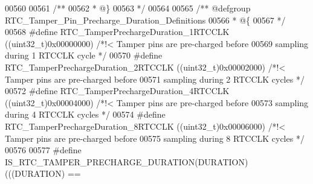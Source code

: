 \begin{DoxyCode}
00560 
00561 \textcolor{comment}{/**}
00562 \textcolor{comment}{  * @\}}
00563 \textcolor{comment}{  */}
00564 
00565   \textcolor{comment}{/** @defgroup RTC\_Tamper\_Pin\_Precharge\_Duration\_Definitions }
00566 \textcolor{comment}{  * @\{}
00567 \textcolor{comment}{  */}
00568 \textcolor{preprocessor}{#}\textcolor{preprocessor}{define} \textcolor{preprocessor}{RTC\_TamperPrechargeDuration\_1RTCCLK} \textcolor{preprocessor}{(}\textcolor{preprocessor}{(}\textcolor{preprocessor}{uint32\_t}\textcolor{preprocessor}{)}0x00000000\textcolor{preprocessor}{)}  \textcolor{comment}{/*!< Tamper pins are pre-charged
       before }
00569 \textcolor{comment}{                                                                         sampling during 1 RTCCLK
       cycle */}
00570 \textcolor{preprocessor}{#}\textcolor{preprocessor}{define} \textcolor{preprocessor}{RTC\_TamperPrechargeDuration\_2RTCCLK} \textcolor{preprocessor}{(}\textcolor{preprocessor}{(}\textcolor{preprocessor}{uint32\_t}\textcolor{preprocessor}{)}0x00002000\textcolor{preprocessor}{)}  \textcolor{comment}{/*!< Tamper pins are pre-charged
       before }
00571 \textcolor{comment}{                                                                         sampling during 2 RTCCLK
       cycles */}
00572 \textcolor{preprocessor}{#}\textcolor{preprocessor}{define} \textcolor{preprocessor}{RTC\_TamperPrechargeDuration\_4RTCCLK} \textcolor{preprocessor}{(}\textcolor{preprocessor}{(}\textcolor{preprocessor}{uint32\_t}\textcolor{preprocessor}{)}0x00004000\textcolor{preprocessor}{)}  \textcolor{comment}{/*!< Tamper pins are pre-charged
       before }
00573 \textcolor{comment}{                                                                         sampling during 4 RTCCLK
       cycles */}
00574 \textcolor{preprocessor}{#}\textcolor{preprocessor}{define} \textcolor{preprocessor}{RTC\_TamperPrechargeDuration\_8RTCCLK} \textcolor{preprocessor}{(}\textcolor{preprocessor}{(}\textcolor{preprocessor}{uint32\_t}\textcolor{preprocessor}{)}0x00006000\textcolor{preprocessor}{)}  \textcolor{comment}{/*!< Tamper pins are pre-charged
       before }
00575 \textcolor{comment}{                                                                         sampling during 8 RTCCLK
       cycles */}
00576 
00577 \textcolor{preprocessor}{#}\textcolor{preprocessor}{define} \textcolor{preprocessor}{IS\_RTC\_TAMPER\_PRECHARGE\_DURATION}\textcolor{preprocessor}{(}\textcolor{preprocessor}{DURATION}\textcolor{preprocessor}{)} \textcolor{preprocessor}{(}\textcolor{preprocessor}{(}\textcolor{preprocessor}{(}\textcolor{preprocessor}{DURATION}\textcolor{preprocessor}{)} \textcolor{preprocessor}{==} 

\end{DoxyCode}
